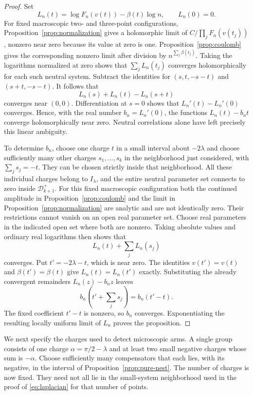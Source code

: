 \begin{proof}
Set
\[
 L_n(t)=\log F_n(v(t))-\beta(t)\log n,\qquad L_n(0)=0.
\]
For fixed macroscopic two- and three-point configurations,
Proposition~\ref{prop:normalization} gives a holomorphic limit of
$C/\prod_jF_n(v(t_j))$, nonzero near zero because its value at zero
is one.  Proposition~\ref{prop:coulomb} gives the corresponding
nonzero limit after division by $n^{\sum_j\beta(t_j)}$.
Taking the logarithms normalized at zero shows that
$\sum_jL_n(t_j)$ converges holomorphically for each such neutral
system.  Subtract the identities for $(s,t,-s-t)$ and $(s+t,-s-t)$.
It follows that
\[
 L_n(s)+L_n(t)-L_n(s+t)
\]
converges near $(0,0)$.  Differentiation at $s=0$ shows that
$L_n'(t)-L_n'(0)$ converges.  Hence, with the real number
$b_n=L_n'(0)$, the functions $L_n(t)-b_nt$ converge holomorphically
near zero.  Neutral correlations alone have left precisely this
linear ambiguity.

To determine $b_n$, choose one charge $t$ in a small interval about
$-2\lambda$ and choose sufficiently many other charges
$s_1,\ldots,s_k$ in the neighborhood just considered, with
$\sum_js_j=-t$.  They can be chosen strictly inside that neighborhood.
All these individual charges belong to $I_\lambda$, and the entire
neutral parameter set connects to zero inside $\mathcal D_{k+1}^+$.
For this fixed macroscopic configuration both the continued amplitude
in Proposition~\ref{prop:coulomb} and the limit in
Proposition~\ref{prop:normalization} are analytic and are not
identically zero.  Their restrictions cannot vanish on an open real
parameter set.  Choose real parameters in the indicated open set where
both are nonzero.  Taking absolute values and ordinary real logarithms
then shows that
\[
 L_n(t)+\sum_jL_n(s_j)
\]
converges.  Put $t'=-2\lambda-t$, which is near zero.
The identities $v(t')=v(t)$ and $\beta(t')=\beta(t)$ give
$L_n(t)=L_n(t')$ exactly.  Substituting the already convergent
remainders $L_n(z)-b_nz$ leaves
\[
 b_n\left(t'+\sum_js_j\right)=b_n(t'-t).
\]
The fixed coefficient $t'-t$ is nonzero, so $b_n$ converges.
Exponentiating the resulting locally uniform limit of $L_n$ proves
the proposition.
\end{proof}

We next specify the charges used to detect microscopic arms.  A
single group consists of one charge $\alpha=\pi/2-\lambda$ and
at least two small negative charges whose sum is $-\alpha$.
Choose sufficiently many compensators that each lies, with its
negative, in the interval of Proposition~\ref{prop:pure-nest}.
The number of charges is now fixed.  They need not all lie in the
small-system neighborhood used in the proof of
\eqref{eq:laplacian} for that number of points.

